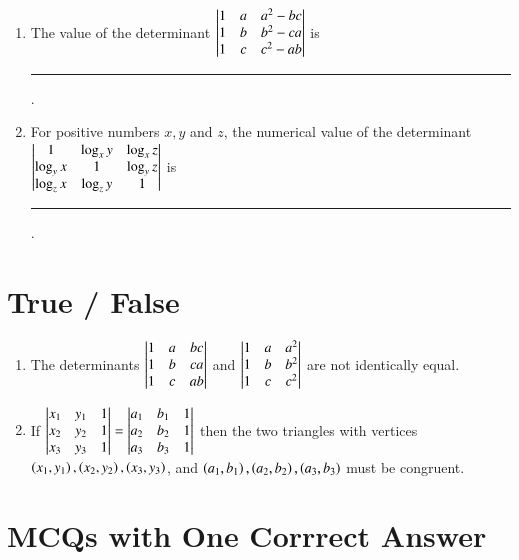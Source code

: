 \documentclass[journal,12pt,twocolumn]{IEEEtran}
\theoremstyle{remark}
\begin{document}
\begin{enumerate}
	\item The value of the determinant $\begin{vmatrix}
			1 & a & a^2 - bc \\
			1 & b & b^2 - ca \\
			1 & c & c^2 - ab
		\end{vmatrix}$ is \rule{1cm}{0.15mm}.	
		\hfill {}

	\item For positive numbers $x, y$ and $z$, the numerical value of the determinant
		$\begin{vmatrix}
			1 & \log_x{y} & \log_x{z} \\
			\log_y{x} & 1 & \log_y{z} \\
			\log_z{x} & \log_z{y} & 1 \\
		\end{vmatrix}$ is \rule{1cm}{0.15mm}.
		\hfill {}
\end{enumerate}

\section{True / False}

\begin{enumerate}
	\item The determinants $\begin{vmatrix}
			1 & a & bc \\
			1 & b & ca \\
			1 & c & ab
		\end{vmatrix}$ and $\begin{vmatrix}
			1 & a & a^2 \\
			1 & b & b^2 \\
			1 & c & c^2
		\end{vmatrix}$ are not identically equal.
		\hfill {}
	
	\item If $\begin{vmatrix}
			x_1 & y_1 & 1 \\
			x_2 & y_2 & 1 \\
			x_3 & y_3 & 1
		\end{vmatrix} = \begin{vmatrix}
			a_1 & b_1 & 1 \\
			a_2 & b_2 & 1 \\
			a_3 & b_3 & 1
		\end{vmatrix}$ then the two triangles with vertices	
		$\left(x_1, y_1\right), \left(x_2, y_2\right), \left(x_3, y_3\right)$,
		and $\left(a_1, b_1\right), \left(a_2, b_2\right), \left(a_3, b_3\right)$
		must be congruent.
		\hfill {}
\end{enumerate}

\section{MCQs with One Corrrect Answer}
\end{document}
